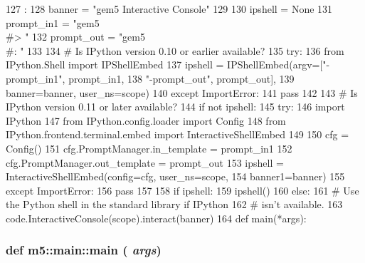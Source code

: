 \begin{DoxyCode}
127                    :
128     banner = "gem5 Interactive Console"
129 
130     ipshell = None
131     prompt_in1 = "gem5 \\#> "
132     prompt_out = "gem5 \\#: "
133 
134     # Is IPython version 0.10 or earlier available?
135     try:
136         from IPython.Shell import IPShellEmbed
137         ipshell = IPShellEmbed(argv=["-prompt_in1", prompt_in1,
138                                      "-prompt_out", prompt_out],
139                                banner=banner, user_ns=scope)
140     except ImportError:
141         pass
142 
143     # Is IPython version 0.11 or later available?
144     if not ipshell:
145         try:
146             import IPython
147             from IPython.config.loader import Config
148             from IPython.frontend.terminal.embed import InteractiveShellEmbed
149 
150             cfg = Config()
151             cfg.PromptManager.in_template = prompt_in1
152             cfg.PromptManager.out_template = prompt_out
153             ipshell = InteractiveShellEmbed(config=cfg, user_ns=scope,
154                                             banner1=banner)
155         except ImportError:
156             pass
157 
158     if ipshell:
159         ipshell()
160     else:
161         # Use the Python shell in the standard library if IPython
162         # isn't available.
163         code.InteractiveConsole(scope).interact(banner)
164 
def main(*args):
\end{DoxyCode}
\hypertarget{namespacem5_1_1main_ad7f72c0fe293565319a7f5e3a7100fcb}{
\subsubsection[{main}]{\setlength{\rightskip}{0pt plus 5cm}def m5::main::main ( {\em args})}}
\label{namespacem5_1_1main_ad7f72c0fe293565319a7f5e3a7100fcb}



